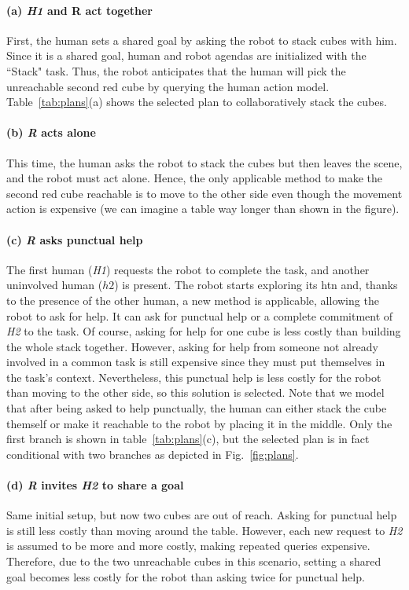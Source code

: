 \paragraph{(a) \textit{H1} and R act together}
First, the human sets a shared goal by asking the robot to stack cubes with him. Since it is a shared goal, human and robot agendas are initialized with the ``Stack" task. Thus, the robot anticipates that the human will pick the unreachable second red cube by querying the human action model. Table~\ref {tab:plans}(a) shows the selected plan to collaboratively stack the cubes. 

\paragraph{(b) \textit{R} acts alone}
This time, the human asks the robot to stack the cubes but then leaves the scene, and the robot must act alone. Hence, the only applicable method to make the second red cube reachable is to move to the other side even though the movement action is expensive (we can imagine a table way longer than shown in the figure).

\paragraph{(c) \textit{R} asks punctual help}
The first human (\textit{H1}) requests the robot to complete the task, and another uninvolved human ($h2$) is present. The robot starts exploring its \acrshort{htn} and, thanks to the presence of the other human, a new method is applicable, allowing the robot to ask for help. It can ask for punctual help or a complete commitment of \textit{H2} to the task. Of course, asking for help for one cube is less costly than building the whole stack together. However, asking for help from someone not already involved in a common task is still expensive since they must put themselves in the task's context. 
Nevertheless, this punctual help is less costly for the robot than moving to the other side, so this solution is selected. Note that we model that after being asked to help punctually, the human can either stack the cube themself or make it reachable to the robot by placing it in the middle. Only the first branch is shown in table~\ref{tab:plans}(c), but the selected plan is in fact conditional with two branches as depicted in Fig.~\ref{fig:plans}.

\paragraph{(d) \textit{R} invites \textit{H2} to share a goal}
Same initial setup, but now two cubes are out of reach. Asking for punctual help is still less costly than moving around the table. 
However, each new request to \textit{H2} is assumed to be more and more costly, making repeated queries expensive.  
Therefore, due to the two unreachable cubes in this scenario, setting a shared goal becomes less costly for the robot than asking twice for punctual help.

